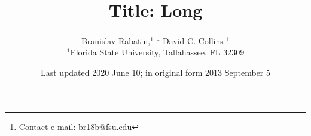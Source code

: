 
\title[Title: Short]{Title: Long}

\author[B. Rabatin et al.]{Branislav Rabatin,$^{1}$%
\thanks{Contact e-mail: \href{mailto:br18b@fsu.edu}{br18b@fsu.edu}}%
David C. Collins $^{1}$
\\
$^{1}$Florida State University, Tallahassee, FL 32309}

\date{Last updated 2020 June 10; in original form 2013 September 5}



\label{firstpage}
\pagerange{\pageref{firstpage}--\pageref{lastpage}}
\maketitle
